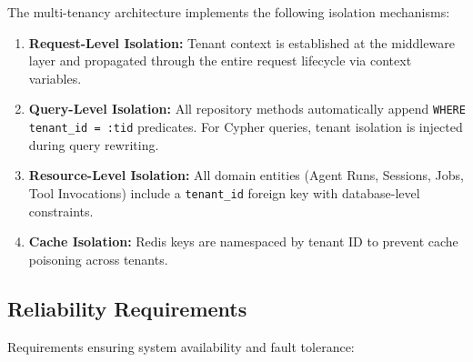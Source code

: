 \documentclass[a4paper,twoside]{sapthesis}
\begin{document}
The multi-tenancy architecture implements the following isolation mechanisms:

\begin{enumerate}
    \item \textbf{Request-Level Isolation:} Tenant context is established at the middleware layer and propagated through the entire request lifecycle via context variables.
    
    \item \textbf{Query-Level Isolation:} All repository methods automatically append \texttt{WHERE tenant\_id = :tid} predicates. For Cypher queries, tenant isolation is injected during query rewriting.
    
    \item \textbf{Resource-Level Isolation:} All domain entities (Agent Runs, Sessions, Jobs, Tool Invocations) include a \texttt{tenant\_id} foreign key with database-level constraints.
    
    \item \textbf{Cache Isolation:} Redis keys are namespaced by tenant ID to prevent cache poisoning across tenants.
\end{enumerate}

\subsection{Reliability Requirements}
\label{subsec:nfr-reliability}

Requirements ensuring system availability and fault tolerance:
\end{document}

